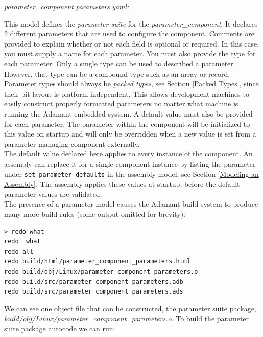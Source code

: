 \textit{parameter\_component.parameters.yaml:}

This model defines the \textit{parameter suite} for the \textit{parameter\_component}. It declares 2 different parameters that are used to configure the component. Comments are provided to explain whether or not each field is optional or required. In this case, you must supply a name for each parameter. You must also provide the type for each parameter. Only a single type can be used to described a parameter. However, that type can be a compound type such as an array or record. Parameter types should always be \textit{packed types}, see Section \ref{Packed Types}, since their bit layout is platform independent. This allows development machines to easily construct properly formatted parameters no matter what machine is running the Adamant embedded system. A default value must also be provided for each parameter. The parameter within the component will be initialized to this value on startup and will only be overridden when a new value is set from a parameter managing component externally. \\

The default value declared here applies to every instance of the component. An assembly can replace it for a single component instance by listing the parameter under \texttt{set\_parameter\_defaults} in the assembly model, see Section \ref{Modeling an Assembly}. The assembly applies these values at startup, before the default parameter values are validated. \\

The presence of a parameter model causes the Adamant build system to produce many more build rules (some output omitted for brevity):

\vspace{5mm} %
\begin{verbatim}
> redo what 
redo  what
redo all
redo build/html/parameter_component_parameters.html
redo build/obj/Linux/parameter_component_parameters.o
redo build/src/parameter_component_parameters.adb
redo build/src/parameter_component_parameters.ads
\end{verbatim}
\vspace{5mm} %

We can see one object file that can be constructed, the parameter suite package, \textit{\url{build/obj/Linux/parameter\_component\_parameters.o}}. To build the parameter suite package autocode we can run:


